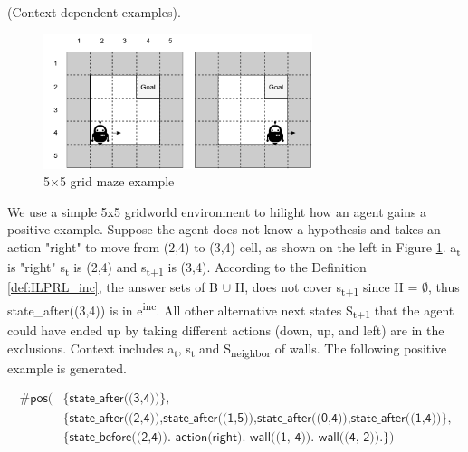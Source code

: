 \begin{examp} \normalfont (Context dependent examples).

\begin{figure}[!htb]
\centering
\includegraphics[width=0.7\textwidth]{./figures/pipeline_example1}
\caption{5$\times$5 grid maze example}
\label{example_pos_example}
\end{figure}

We use a simple 5x5 gridworld environment to hilight how an agent gains a positive example.
Suppose the agent does not know a hypothesis and takes an action "right" to move from (2,4) to (3,4) cell, as shown on the left in Figure \ref{example_pos_example}.
a\textsubscript{t} is "right" s\textsubscript{t} is (2,4) and s\textsubscript{t+1} is (3,4).
According to the Definition \ref{def:ILPRL_inc}, the answer sets of B $\cup$ H, does not cover s\textsubscript{t+1} since H = $\emptyset$, thus \textsf{state\_after((3,4))} is in e\textsuperscript{inc}.
All other alternative next states S\textsubscript{t+1} that the agent could have ended up by taking different actions
(down, up, and left) are in the exclusions.
Context includes a\textsubscript{t}, s\textsubscript{t} and S\textsubscript{neighbor} of walls.
The following positive example is generated.

\begin{equation}
\begin{split}
    \textsf{\#pos(} & \textsf{\{state\_after((3,4))\},}\\
                    & \textsf{\{state\_after((2,4)),state\_after((1,5)),state\_after((0,4)),state\_after((1,4))\},} \\
    & \textsf{\{state\_before((2,4)). action(right). wall((1, 4)). wall((4, 2)).\})}
\end{split}
\end{equation}


\end{examp}
